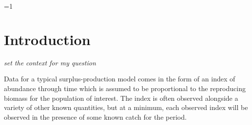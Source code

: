 \documentclass[12pt]{article}
\newcounter{alphasect}
\def\alphainsection{0}
\let\oldsection=\section
\def\section{%
  \ifnum\alphainsection=1%
    \addtocounter{alphasect}{1}
  \fi%
\oldsection}%
\begin{document}
%
\clearpage

%
\section{Introduction\label{int}}

\textit{set the context for my question}

Data for a typical surplus-production model comes in the form of an index
of abundance through time which is assumed to be proportional to the reproducing
biomass for the population of interest. The index is often observed alongside
a variety of other known quantities, but at a minimum, each observed index
will be observed in the presence of some known catch for the period.
\end{document}
